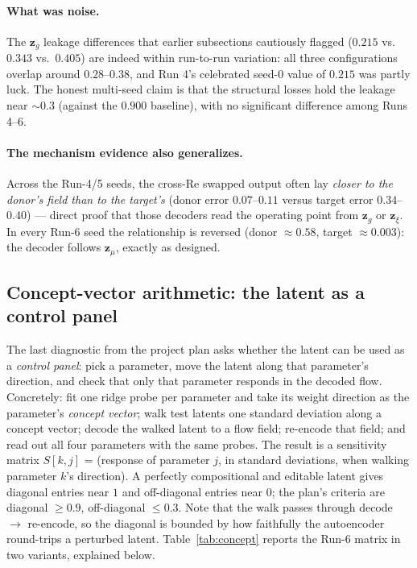 \documentclass[11pt]{article}
\begin{document}
\paragraph{What was noise.} The $\boldsymbol{z}_{g}$ leakage differences
that earlier subsections cautiously flagged ($0.215$ vs.\ $0.343$ vs.\
$0.405$) are indeed within run-to-run variation: all three
configurations overlap around $0.28$--$0.38$, and Run 4's celebrated
seed-0 value of $0.215$ was partly luck. The honest multi-seed claim is
that the structural losses hold the leakage near $\sim 0.3$ (against the
$0.900$ baseline), with no significant difference among Runs 4--6.

\paragraph{The mechanism evidence also generalizes.} Across the Run-4/5
seeds, the cross-Re swapped output often lay \emph{closer to the donor's
field than to the target's} (donor error $0.07$--$0.11$ versus target
error $0.34$--$0.40$) --- direct proof that those decoders read the
operating point from $\boldsymbol{z}_{g}$ or $\boldsymbol{z}_{\xi}$. In
every Run-6 seed the relationship is reversed (donor $\approx 0.58$,
target $\approx 0.003$): the decoder follows $\boldsymbol{z}_{\mu}$,
exactly as designed.

\subsection{Concept-vector arithmetic: the latent as a control panel}

The last diagnostic from the project plan asks whether the latent can be
used as a \emph{control panel}: pick a parameter, move the latent along
that parameter's direction, and check that only that parameter responds
in the decoded flow. Concretely: fit one ridge probe per parameter and
take its weight direction as the parameter's \emph{concept vector}; walk
test latents one standard deviation along a concept vector; decode the
walked latent to a flow field; re-encode that field; and read out all
four parameters with the same probes. The result is a sensitivity matrix
$S[k, j]$ = (response of parameter $j$, in standard deviations, when
walking parameter $k$'s direction). A perfectly compositional and
editable latent gives diagonal entries near $1$ and off-diagonal entries
near $0$; the plan's criteria are diagonal $\ge 0.9$, off-diagonal
$\le 0.3$. Note that the walk passes through decode $\to$ re-encode, so
the diagonal is bounded by how faithfully the autoencoder round-trips a
perturbed latent. Table~\ref{tab:concept} reports the Run-6 matrix in
two variants, explained below.
\end{document}
